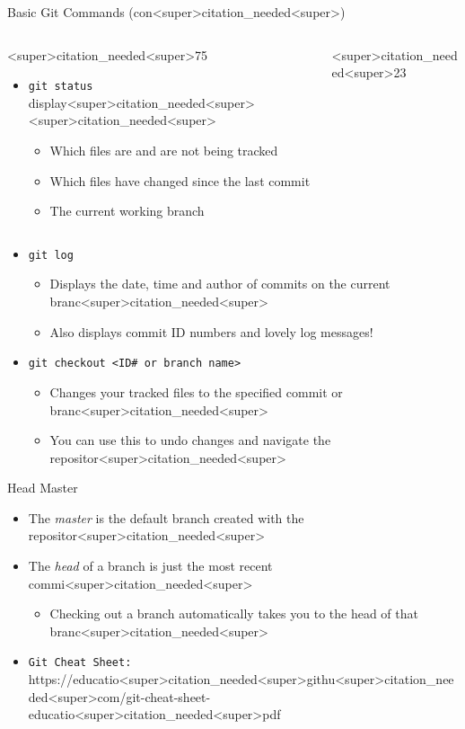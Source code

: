 \documentclass[11pt]{beamer}
\begin{document}
\begin{frame}{Basic Git Commands (con<super>citation_needed<super>)}
\begin{columns}
\begin{column}{<super>citation_needed<super>75\textwidth}
\begin{itemize}
\item \texttt{git status} display<super>citation_needed<super><super>citation_needed<super>
\begin{itemize}
\item Which files are and are not being tracked
\item Which files have changed since the last commit
\item The current working branch
\end{itemize}
\end{itemize}
\end{column}
\begin{column}{<super>citation_needed<super>23\textwidth}
\
\end{column}
\end{columns}

\begin{itemize}
\item \texttt{git log}
\begin{itemize}
\item Displays the date, time and author of commits on the current branc<super>citation_needed<super>
\item Also displays commit ID numbers and lovely log messages! 
\end{itemize}
\item \texttt{git checkout <ID\# or branch name>}
\begin{itemize}
\item Changes your tracked files to the specified commit or branc<super>citation_needed<super>
\item You can use this to undo changes and navigate the repositor<super>citation_needed<super>
\end{itemize}
\end{itemize}
\end{frame}

\begin{frame}{Head Master}
\center
\
\begin{itemize}
    \item The \textit{master} is the default branch created with the repositor<super>citation_needed<super> 
    \item The \textit{head} of a branch is just the most recent commi<super>citation_needed<super>  
    \begin{itemize}
        \item Checking out a branch automatically takes you to the head of that branc<super>citation_needed<super>  
    \end{itemize}
    \item \texttt{Git Cheat Sheet:} https://educatio<super>citation_needed<super>githu<super>citation_needed<super>com/git-cheat-sheet-educatio<super>citation_needed<super>pdf
\end{itemize}
\end{frame}
\end{document}

